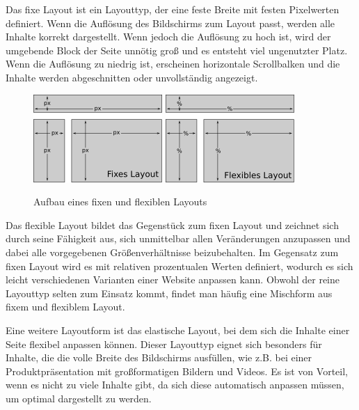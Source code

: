 Das fixe Layout ist ein Layouttyp, der eine feste Breite mit festen Pixelwerten definiert. Wenn die Auflösung des Bildschirms zum Layout passt, werden alle Inhalte korrekt dargestellt. Wenn jedoch die Auflösung zu hoch ist, wird der umgebende Block der Seite unnötig groß und es entsteht viel ungenutzter Platz. Wenn die Auflösung zu niedrig ist, erscheinen horizontale Scrollbalken und die Inhalte werden abgeschnitten oder unvollständig angezeigt.


\begin{figure}[!htb]
    \centering
    \includegraphics[scale=1.2]{figures/jan/Wire_Fixes-Layout.png}
    \hspace{0.05\textwidth}
    \includegraphics[scale=1.2]{figures/jan/Wire_Flexibles-Layout.png}
    \caption[Aufbau eines fixen und flexiblen Layouts]{Aufbau eines fixen und flexiblen Layouts}
    \label{fig:image}
\end{figure}

Das flexible Layout bildet das Gegenstück zum fixen Layout und zeichnet sich durch seine Fähigkeit aus, sich unmittelbar allen Veränderungen anzupassen und dabei alle vorgegebenen Größenverhältnisse beizubehalten. Im Gegensatz zum fixen Layout wird es mit relativen prozentualen Werten definiert, wodurch es sich leicht verschiedenen Varianten einer Website anpassen kann. Obwohl der reine Layouttyp selten zum Einsatz kommt, findet man häufig eine Mischform aus fixem und flexiblem Layout.

Eine weitere Layoutform ist das elastische Layout, bei dem sich die Inhalte einer Seite flexibel anpassen können. Dieser Layouttyp eignet sich besonders für Inhalte, die die volle Breite des Bildschirms ausfüllen, wie z.B. bei einer Produktpräsentation mit großformatigen Bildern und Videos. Es ist von Vorteil, wenn es nicht zu viele Inhalte gibt, da sich diese automatisch anpassen müssen, um optimal dargestellt zu werden.

